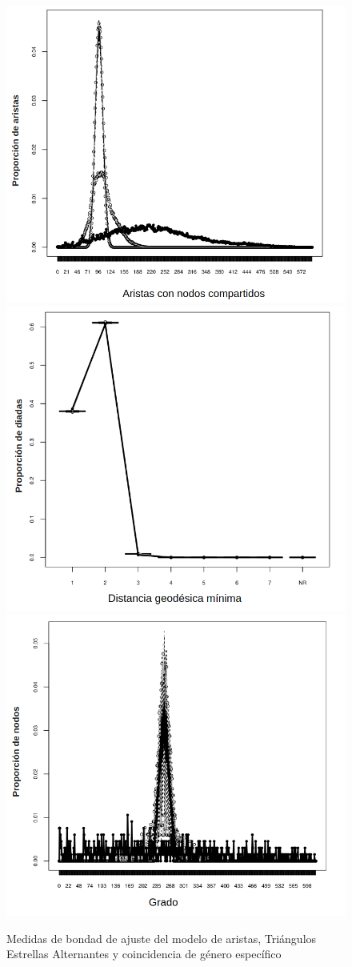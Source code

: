 \begin{figure}[!ht]
\includegraphics[width=.5\textwidth]{Tesis/Figures/gof_3_aristas_nodos_compartidos.png}
\includegraphics[width=.5\textwidth]{Tesis/Figures/gof_3_distancia.png}
\includegraphics[width=.5\textwidth]{Tesis/Figures/gof_3_grado.png}
\caption{Medidas de bondad de ajuste del modelo de aristas, Triángulos Estrellas Alternantes y coincidencia de género específico}
\end{figure}